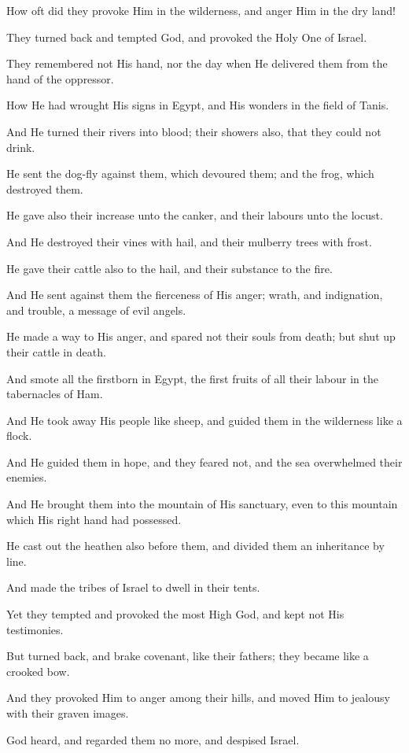 How oft did they provoke Him in the wilderness, and anger Him in the dry land!

They turned back and tempted God, and provoked the Holy One of Israel.

They remembered not His hand, nor the day when He delivered them from the hand of the oppressor.

How He had wrought His signs in Egypt, and His wonders in the field of Tanis.

And He turned their rivers into blood; their showers also, that they could not drink.

He sent the dog-fly against them, which devoured them; and the frog, which destroyed them.

He gave also their increase unto the canker, and their labours unto the locust.

And He destroyed their vines with hail, and their mulberry trees with frost.

He gave their cattle also to the hail, and their substance to the fire.

And He sent against them the fierceness of His anger; wrath, and indignation, and trouble, a message of evil angels.

He made a way to His anger, and spared not their souls from death; but shut up their cattle in death.

And smote all the firstborn in Egypt, the first fruits of all their labour in the tabernacles of Ham.

And He took away His people like sheep, and guided them in the wilderness like a flock.

And He guided them in hope, and they feared not, and the sea overwhelmed their enemies.

And He brought them into the mountain of His sanctuary, even to this mountain which His right hand had possessed.

He cast out the heathen also before them, and divided them an inheritance by line.

And made the tribes of Israel to dwell in their tents.

Yet they tempted and provoked the most High God, and kept not His testimonies.

But turned back, and brake covenant, like their fathers; they became like a crooked bow.

And they provoked Him to anger among their hills, and moved Him to jealousy with their graven images.

God heard, and regarded them no more, and despised Israel.

